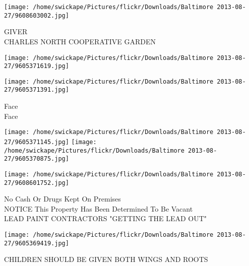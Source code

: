 \documentclass[10pt,letterpaper]{article}
\begin{document}
\vspace{0.25in}
\texttt{[image: /home/swickape/Pictures/flickr/Downloads/Baltimore 2013-08-27/9608603002.jpg]}

GIVER\\
CHARLES NORTH COOPERATIVE GARDEN\\
\pagebreak

\texttt{[image: /home/swickape/Pictures/flickr/Downloads/Baltimore 2013-08-27/9605371619.jpg]}

\vspace{0.25in}
\texttt{[image: /home/swickape/Pictures/flickr/Downloads/Baltimore 2013-08-27/9605371391.jpg]}

Face\\
Face\\
\pagebreak

\texttt{[image: /home/swickape/Pictures/flickr/Downloads/Baltimore 2013-08-27/9605371145.jpg]}
\texttt{[image: /home/swickape/Pictures/flickr/Downloads/Baltimore 2013-08-27/9605370875.jpg]}

\vspace{0.25in}
\texttt{[image: /home/swickape/Pictures/flickr/Downloads/Baltimore 2013-08-27/9608601752.jpg]}

No Cash Or Drugs Kept On Premises\\
NOTICE This Property Has Been Determined To Be Vacant\\
LEAD PAINT CONTRACTORS "GETTING THE LEAD OUT"\\
\pagebreak

\texttt{[image: /home/swickape/Pictures/flickr/Downloads/Baltimore 2013-08-27/9605369419.jpg]}

CHILDREN SHOULD BE GIVEN BOTH WINGS AND ROOTS\\
\pagebreak
\end{document}
